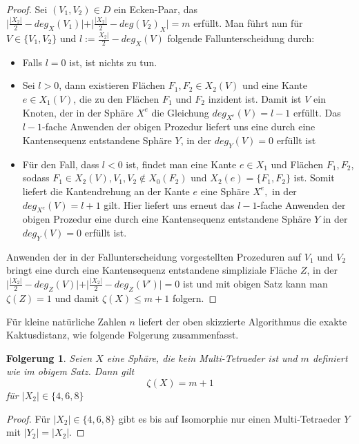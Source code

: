 \documentclass[12pt,titlepage,twoside,cleardoublepage]{article}
\theoremstyle{nummermitklammern}
\newtheorem{folgerung}[temp]{Folgerung}
\newtheorem{folgerung}[zahl]{Folgerung}
\numberwithin{equation}{section}
\begin{document}
\begin{proof}
Sei $(V_1,V_2)\in D$ ein Ecken-Paar, das 
$\vert\frac{\vert X_2 \vert}{2}-deg_X(V_1)\vert +\vert \frac{\vert X_2 \vert}{2}-deg(V_2)_X\vert=m$ erfüllt.
Man führt nun für $V \in \{V_1,V_2\}$ und $l:=\frac{X_2 \vert}{2}-deg_X(V)$ folgende Fallunterscheidung durch:
\begin{itemize}
\item Falls $l=0$ ist, ist nichts zu tun.
\item Sei $l>0$, dann existieren Flächen $F_1,F_2 \in X_2(V)$ und eine Kante $e\in X_1(V)$, die zu den Flächen $F_1$ und $F_2$ inzident ist. Damit ist $V$ ein Knoten, der in der Sphäre $X^e$ die Gleichung $deg_{X^e}(V)=l-1$ erfüllt. Das $l-1$-fache Anwenden der obigen Prozedur liefert uns eine durch eine Kantensequenz entstandene Sphäre $Y$, in der  $deg_Y(V)=0$ erfüllt ist 
 \item Für den Fall, dass $l<0$ ist, findet man eine Kante $e\in X_1$ und Flächen $F_1,F_2$, sodass $F_1\in X_2(V),V_1,V_2 \notin X_0(F_2)$ und $X_2(e)=\{F_1,F_2\}$ ist. Somit liefert die Kantendrehung an der Kante $e$ eine Sphäre $X^e,$ in der $deg_{X^e}(V)=l+1$ gilt. Hier liefert uns erneut das $l-1$-fache Anwenden der obigen Prozedur eine durch eine Kantensequenz entstandene Sphäre $Y$ in der  $deg_Y(V)=0$ erfüllt ist.
\end{itemize}  
 Anwenden der in der Fallunterscheidung vorgestellten Prozeduren auf $V_1$ und $V_2$ bringt eine durch eine Kantensequenz entstandene simpliziale Fläche $Z$, in der $\vert\frac{\vert X_2 \vert}{2}-deg_Z(V)\vert +\vert \frac{\vert X_2 \vert}{2}-deg_Z(V')\vert=0$ ist und mit obigen Satz kann man $\zeta(Z)=1$ und damit $\zeta(X)\leq m+1$ folgern. 
\end{proof}

Für kleine natürliche Zahlen $n$ liefert der oben skizzierte Algorithmus die exakte Kaktusdistanz, wie folgende Folgerung zusammenfasst. 
\begin{folgerung}
Seien $X$ eine Sphäre, die kein Multi-Tetraeder ist und $m$ definiert wie im obigem Satz. Dann gilt 
\[
\zeta(X)= m+1
\]
 für $\vert X_2 \vert \in \{4,6,8\}$ 
\end{folgerung}
\begin{proof}
Für $\vert X_2 \vert \in \{4,6,8\}$ gibt es bis auf Isomorphie nur einen Multi-Tetraeder $Y$ mit $\vert Y_2\vert=\vert X_2\vert.$
\end{proof}
\end{document}
